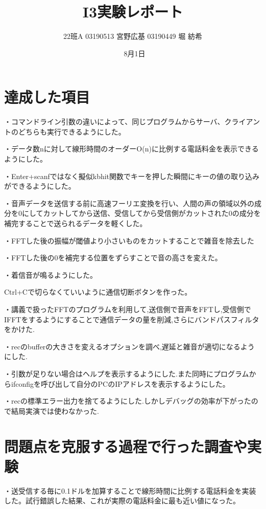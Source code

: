 \documentclass[dvipdfmx]{jsarticle}
\begin{document}
\title{I3実験レポート}
\author{22班A 03190513 宮野広基 03190449  堀 紡希}
\date{\ 8月1日}
\maketitle


\section{達成した項目}

・コマンドライン引数の違いによって、同じプログラムからサーバ、クライアントのどちらも実行できるようにした。

・データ数nに対して線形時間のオーダーO(n)に比例する電話料金を表示できるようにした。

・Enter+scanfではなく擬似kbhit関数でキーを押した瞬間にキーの値の取り込みができるようにした。

・音声データを送信する前に高速フーリエ変換を行い、人間の声の領域以外の成分を0にしてカットしてから送信、受信してから受信側がカットされた0の成分を補完することで送られるデータを軽くした。

・FFTした後の振幅が閾値より小さいものをカットすることで雑音を除去した

・FFTした後の0を補完する位置をずらすことで音の高さを変えた。

・着信音が鳴るようにした。

Ctrl+Cで切らなくていいように通信切断ボタンを作った。

・講義で扱ったFFTのプログラムを利用して,送信側で音声をFFTし,受信側でIFFTをするようにすることで通信データの量を削減,さらにバンドパスフィルタをかけた.

・recのbufferの大きさを変えるオプションを調べ,遅延と雑音が適切になるようにした.

・引数が足りない場合はヘルプを表示するようにした.また同時にプログラムからifconfigを呼び出して自分のPCのIPアドレスを表示するようにした。

・recの標準エラー出力を捨てるようにした.しかしデバッグの効率が下がったので結局実演では使わなかった.



\section{問題点を克服する過程で行った調査や実験}

・送受信する毎に0.1ドルを加算することで線形時間に比例する電話料金を実装した。試行錯誤した結果、これが実際の電話料金に最も近い値になった。
\end{document}
